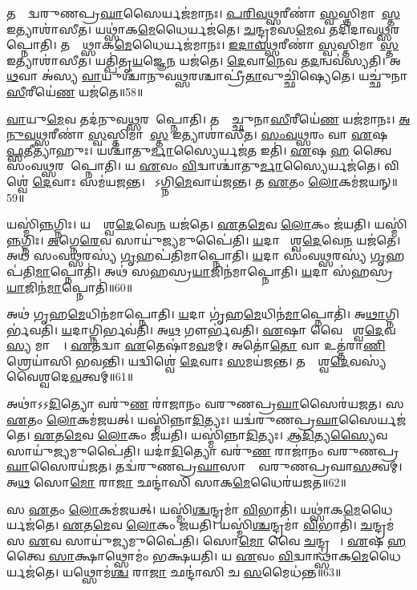 𑌤𑌸𑍍𑌮𑌾᳚𑌦𑍍𑌵𑌰𑍁𑌣𑌪𑍍𑌰\ul{𑌘𑌾}𑌸𑍈𑌰𑍍𑌯𑌜॑𑌮𑌾𑌨𑌃।
\ul{𑌪}\ul{𑌰𑌿}\ul{𑌵}\ul{𑌥𑍍𑌸}𑌰𑍀𑌣𑌾॑ \ul{𑌸𑍍𑌵}𑌸𑍍𑌤𑌿𑌮𑌾\-𑌶𑌾᳚\ul{𑌸𑍍𑌤} 𑌇𑌤𑍍𑌯𑌾𑌶𑌾॑𑌸𑍀𑌤।
𑌯𑌥𑍍𑌸𑌾॑𑌕\ul{𑌮𑍇}𑌧𑍈𑌰𑍍𑌯𑌜॑𑌤𑍇।
\ul{𑌚}𑌨𑍍𑌦𑍍𑌰𑌮॑𑌸\ul{𑌮𑍇}𑌵 𑌤𑌦𑌿॑𑌦𑌾𑌵\ul{𑌥𑍍𑌸}𑌰\-𑌮𑌾᳚𑌪𑍍𑌨𑍋𑌤𑌿।
𑌤𑌸𑍍𑌮𑌾᳚𑌥𑍍𑌸𑌾𑌕\ul{𑌮𑍇}𑌧𑍈𑌰𑍍𑌯𑌜॑𑌮𑌾𑌨𑌃।
\ul{𑌇}\ul{𑌦𑌾}\-\ul{𑌵}\ul{𑌥𑍍𑌸}𑌰𑍀𑌣𑌾॑ \ul{𑌸𑍍𑌵}𑌸𑍍𑌤𑌿𑌮𑌾𑌶𑌾᳚\ul{𑌸𑍍𑌤} 𑌇𑌤𑍍𑌯𑌾𑌶𑌾॑𑌸𑍀𑌤।
𑌯𑌤𑍍𑌪𑌿॑𑌤𑍃\ul{𑌯}𑌜𑍍𑌞𑍇\ul{𑌨} 𑌯𑌜॑𑌤𑍇।
\ul{𑌦𑍇}𑌵𑌾\ul{𑌨𑍇}𑌵 𑌤\ul{𑌦}𑌨𑍍𑌵𑌵॑𑌸𑍍𑌯𑌤𑌿।
𑌅\ul{𑌥}𑌵𑌾 𑌅॑𑌸𑍍𑌯 \ul{𑌵𑌾}𑌯𑍁𑌶𑍍𑌚𑌾॑𑌨𑍁\-𑌵\ul{𑌥𑍍𑌸}𑌰𑌶𑍍𑌚𑌾𑌪𑍍𑌰𑍀॑\ul{𑌤𑌾}\-𑌵𑍁𑌚𑍍𑌛𑌿॑𑌷𑍍𑌯𑍇𑌤𑍇।
𑌯𑌚𑍍𑌛𑍁॑𑌨𑌾\ul{𑌸𑍀}𑌰𑍀𑌯𑍇॑\ul{𑌣} 𑌯𑌜॑𑌤𑍇॥58॥

\ul{𑌵𑌾}𑌯𑍁\ul{𑌮𑍇}𑌵 𑌤𑌦॑𑌨𑍁𑌵\ul{𑌥𑍍𑌸}𑌰𑌮𑌾᳚𑌪𑍍𑌨𑍋𑌤𑌿।
𑌤𑌸𑍍𑌮𑌾᳚𑌚𑍍𑌛𑍁𑌨𑌾\ul{𑌸𑍀}𑌰𑍀𑌯𑍇॑\ul{𑌣} 𑌯𑌜॑𑌮𑌾𑌨𑌃।
\ul{𑌅}\ul{𑌨𑍁}\ul{𑌵}\ul{𑌥𑍍𑌸}𑌰𑍀𑌣𑌾॑ \ul{𑌸𑍍𑌵}𑌸𑍍𑌤𑌿𑌮𑌾𑌶𑌾᳚\ul{𑌸𑍍𑌤} 𑌇𑌤𑍍𑌯𑌾𑌶𑌾॑𑌸𑍀𑌤।
\ul{𑌸𑌂}\ul{𑌵}\ul{𑌥𑍍𑌸}𑌰𑌂 𑌵𑌾 \ul{𑌏}𑌷 𑌈᳚\ul{𑌫𑍍𑌸}𑌤𑍀𑌤𑍍𑌯𑌾॑𑌹𑍁𑌃।
𑌯𑌶𑍍𑌚𑌾॑𑌤𑍁\ul{𑌰𑍍𑌮𑌾}𑌸𑍍𑌯𑍈𑌰𑍍𑌯𑌜॑\ul{𑌤} 𑌇𑌤𑌿॑।
\ul{𑌏}𑌷 \ul{𑌹} 𑌤𑍍𑌵𑍈 𑌸𑌂॑𑌵\ul{𑌥𑍍𑌸}𑌰𑌮𑌾᳚𑌪𑍍𑌨𑍋𑌤𑌿।
𑌯 \ul{𑌏}𑌵𑌂 \ul{𑌵𑌿}𑌦𑍍𑌵𑌾𑌶𑍍𑌚𑌾॑𑌤𑍁\ul{𑌰𑍍𑌮𑌾}𑌸𑍍𑌯𑍈𑌰𑍍𑌯𑌜॑𑌤𑍇।
𑌵𑌿𑌶𑍍𑌵𑍇॑ \ul{𑌦𑍇}𑌵𑌾𑌃 𑌸𑌮॑𑌯𑌜𑌨𑍍𑌤।
𑌤𑍇᳚𑌽𑌗𑍍𑌨𑌿\ul{𑌮𑍇}𑌵𑌾𑌯॑𑌜𑌨𑍍𑌤।
𑌤 \ul{𑌏}𑌤𑌂 \ul{𑌲𑍋}𑌕𑌮॑𑌜𑌯𑌨𑍍॥59॥

𑌯𑌸𑍍𑌮𑌿॑\ul{𑌨𑍍𑌨}𑌗𑍍𑌨𑌿𑌃।
𑌯𑌦𑍍𑌵𑍈᳚𑌶𑍍𑌵\ul{𑌦𑍇}𑌵𑍇\ul{𑌨} 𑌯𑌜॑𑌤𑍇।
\ul{𑌏}𑌤\ul{𑌮𑍇}𑌵 \ul{𑌲𑍋}𑌕𑌂 𑌜॑𑌯𑌤𑌿।
𑌯𑌸𑍍𑌮𑌿॑\ul{𑌨𑍍𑌨}𑌗𑍍𑌨𑌿𑌃।
\ul{𑌅}𑌗𑍍𑌨𑍇\ul{𑌰𑍇}𑌵 𑌸𑌾𑌯𑍁॑\ul{𑌜𑍍𑌯}𑌮𑍁𑌪𑍈॑𑌤𑌿।
\ul{𑌯}𑌦𑌾 𑌵𑍈᳚𑌶𑍍𑌵\ul{𑌦𑍇}𑌵𑍇\ul{𑌨} 𑌯𑌜॑𑌤𑍇।
𑌅𑌥॑ 𑌸𑌂𑌵\ul{𑌥𑍍𑌸}𑌰𑌸𑍍𑌯॑ \ul{𑌗𑍃}𑌹𑌪॑𑌤𑌿𑌮𑌾𑌪𑍍𑌨𑍋𑌤𑌿।
\ul{𑌯}𑌦𑌾 𑌸𑌂॑𑌵\ul{𑌥𑍍𑌸}𑌰𑌸𑍍𑌯॑ \ul{𑌗𑍃}𑌹𑌪॑𑌤𑌿\ul{𑌮𑌾}𑌪𑍍𑌨𑍋𑌤𑌿॑।
𑌅𑌥॑ 𑌸𑌹𑌸𑍍𑌰\ul{𑌯𑌾}𑌜𑌿𑌨॑𑌮𑌾𑌪𑍍𑌨𑍋𑌤𑌿।
\ul{𑌯}𑌦𑌾 𑌸॑𑌹𑌸𑍍𑌰\ul{𑌯𑌾}𑌜𑌿𑌨॑\ul{𑌮𑌾}𑌪𑍍𑌨𑍋𑌤𑌿॑॥60॥

𑌅𑌥॑ 𑌗𑍃𑌹\ul{𑌮𑍇}𑌧𑌿𑌨॑𑌮𑌾𑌪𑍍𑌨𑍋𑌤𑌿।
\ul{𑌯}𑌦𑌾 𑌗𑍃॑𑌹\ul{𑌮𑍇}𑌧𑌿𑌨॑\ul{𑌮𑌾}𑌪𑍍𑌨𑍋𑌤𑌿॑।
𑌅\ul{𑌥𑌾}𑌗𑍍𑌨𑌿𑌰𑍍𑌭॑𑌵𑌤𑌿।
\ul{𑌯}𑌦𑌾𑌗𑍍𑌨𑌿𑌰𑍍𑌭𑌵॑𑌤𑌿।
𑌅\ul{𑌥} 𑌗𑍗𑌰𑍍𑌭॑𑌵𑌤𑌿।
\ul{𑌏}𑌷𑌾 𑌵𑍈 𑌵𑍈᳚𑌶𑍍𑌵\ul{𑌦𑍇}𑌵\ul{𑌸𑍍𑌯} 𑌮𑌾𑌤𑍍𑌰𑌾᳚।
\ul{𑌏}𑌤𑌦𑍍𑌵𑌾 \ul{𑌏}𑌤𑍇𑌷𑌾॑𑌮\ul{𑌵}𑌮𑌮𑍍।
𑌅𑌤𑍋॑\ul{𑌤𑍋} 𑌵𑌾 𑌉𑌤𑍍𑌤॑𑌰𑌾\ul{𑌣𑌿} 𑌶𑍍𑌰𑍇𑌯𑌾॑𑌸𑌿 𑌭𑌵𑌨𑍍𑌤𑌿।
𑌯𑌦𑍍𑌵𑌿𑌶𑍍𑌵𑍇॑ \ul{𑌦𑍇}𑌵𑌾𑌃 \ul{𑌸}𑌮𑌯॑𑌜𑌨𑍍𑌤।
𑌤𑌦𑍍𑌵𑍈᳚𑌶𑍍𑌵\ul{𑌦𑍇}𑌵𑌸𑍍𑌯॑ 𑌵𑍈𑌶𑍍𑌵𑌦𑍇\ul{𑌵}𑌤𑍍𑌵𑌮𑍍॥61॥

𑌅𑌥𑌾॑𑌽𑌽\ul{𑌦𑌿}𑌤𑍍𑌯𑍋 𑌵𑌰𑍁॑\ul{𑌣}\ul{} 𑌰𑌾॑𑌜𑌾𑌨𑌂 𑌵𑌰𑍁𑌣𑌪𑍍𑌰\ul{𑌘𑌾}𑌸𑍈𑌰॑𑌯𑌜𑌤।
𑌸 \ul{𑌏}𑌤𑌂 \ul{𑌲𑍋}𑌕𑌮॑𑌜𑌯𑌤𑍍।
𑌯𑌸𑍍𑌮𑌿॑𑌨𑍍𑌨𑌾\ul{𑌦𑌿}𑌤𑍍𑌯𑌃।
𑌯𑌦𑍍𑌵॑𑌰𑍁𑌣𑌪𑍍𑌰\ul{𑌘𑌾}𑌸𑍈𑌰𑍍𑌯𑌜॑𑌤𑍇।
\ul{𑌏}𑌤\ul{𑌮𑍇}𑌵 \ul{𑌲𑍋}𑌕𑌂 𑌜॑𑌯𑌤𑌿।
𑌯𑌸𑍍𑌮𑌿॑𑌨𑍍𑌨𑌾\ul{𑌦𑌿}𑌤𑍍𑌯𑌃।
\ul{𑌆}\ul{𑌦𑌿}𑌤𑍍𑌯\ul{𑌸𑍍𑌯𑍈}𑌵 𑌸𑌾𑌯𑍁॑\ul{𑌜𑍍𑌯}𑌮𑍁𑌪𑍈॑𑌤𑌿।
𑌯𑌦𑌾॑\ul{𑌦𑌿}𑌤𑍍𑌯𑍋 𑌵𑌰𑍁॑\ul{𑌣}\ul{} 𑌰𑌾𑌜𑌾॑𑌨𑌂 𑌵𑌰𑍁𑌣𑌪𑍍𑌰\ul{𑌘𑌾}𑌸𑍈\-𑌰𑌯॑𑌜𑌤।
𑌤𑌦𑍍𑌵॑𑌰𑍁𑌣𑌪𑍍𑌰\ul{𑌘𑌾}𑌸𑌾𑌨𑌾𑌂᳚ 𑌵𑌰𑍁𑌣𑌪𑍍𑌰𑌘𑌾\ul{𑌸}𑌤𑍍𑌵𑌮𑍍।
𑌅\ul{𑌥} 𑌸𑍋\ul{𑌮𑍋} 𑌰𑌾\ul{𑌜𑌾} 𑌛𑌨𑍍𑌦𑌾॑𑌸𑌿 𑌸𑌾𑌕\ul{𑌮𑍇}𑌧𑍈𑌰॑𑌯𑌜𑌤॥62॥

𑌸 \ul{𑌏}𑌤𑌂 \ul{𑌲𑍋}𑌕𑌮॑𑌜𑌯𑌤𑍍।
𑌯𑌸𑍍𑌮𑌿॑\ul{𑌶𑍍𑌚}𑌨𑍍𑌦𑍍𑌰𑌮𑌾॑ \ul{𑌵𑌿}𑌭𑌾𑌤𑌿॑।
𑌯𑌥𑍍𑌸𑌾॑𑌕\ul{𑌮𑍇}𑌧𑍈𑌰𑍍𑌯𑌜॑𑌤𑍇।
\ul{𑌏}𑌤\ul{𑌮𑍇}𑌵 \ul{𑌲𑍋}𑌕𑌂 𑌜॑𑌯𑌤𑌿।
𑌯𑌸𑍍𑌮𑌿॑\ul{𑌶𑍍𑌚}𑌨𑍍𑌦𑍍𑌰𑌮𑌾॑ \ul{𑌵𑌿}𑌭𑌾𑌤𑌿॑।
\ul{𑌚}𑌨𑍍𑌦𑍍𑌰𑌮॑𑌸 \ul{𑌏}𑌵 𑌸𑌾𑌯𑍁॑\ul{𑌜𑍍𑌯}𑌮𑍁𑌪𑍈॑𑌤𑌿।
𑌸𑍋\ul{𑌮𑍋} 𑌵𑍈 \ul{𑌚}𑌨𑍍𑌦𑍍𑌰𑌮𑌾𑌃᳚।
\ul{𑌏}𑌷 \ul{𑌹} 𑌤𑍍𑌵𑍈 \ul{𑌸𑌾}𑌕𑍍𑌷𑌾𑌥𑍍𑌸𑍋𑌮𑌂॑ 𑌭𑌕𑍍𑌷𑌯𑌤𑌿।
𑌯 \ul{𑌏}𑌵𑌂 \ul{𑌵𑌿}𑌦𑍍𑌵𑌾𑌨𑍍𑌥𑍍𑌸𑌾॑𑌕\ul{𑌮𑍇}𑌧𑍈𑌰𑍍𑌯𑌜॑𑌤𑍇।
𑌯𑌥𑍍𑌸𑍋𑌮॑\ul{𑌶𑍍𑌚} 𑌰𑌾\ul{𑌜𑌾} 𑌛𑌨𑍍𑌦𑌾॑𑌸𑌿 𑌚 \ul{𑌸}𑌮𑍈𑌧॑𑌨𑍍𑌤॥63॥

